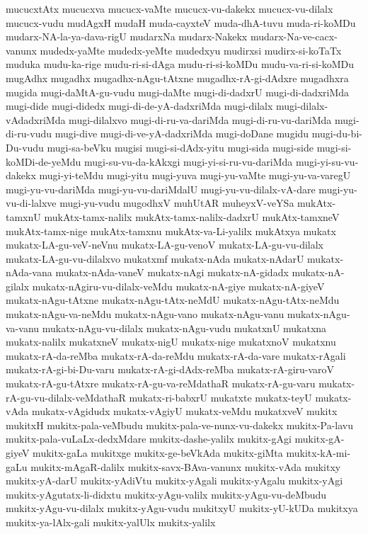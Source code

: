 {mucucxtAtx
mucucxva
mucucx-vaMte
mucucx-vu-dakekx
mucucx-vu-dilalx
mucucx-vudu
mudAgxH
mudaH
muda-cayxteV
muda-dhA-tuvu
muda-ri-koMDu
mudarx-NA-la-ya-dava-rigU
mudarxNa
mudarx-Nakekx
mudarx-Na-ve-cacx-vanunx
mudedx-yaMte
mudedx-yeMte
mudedxyu
mudirxsi
mudirx-si-koTaTx
muduka
mudu-ka-rige
mudu-ri-si-dAga
mudu-ri-si-koMDu
mudu-va-ri-si-koMDu
mugAdhx
mugadhx
mugadhx-nAgu-tAtxne
mugadhx-rA-gi-dAdxre
mugadhxra
mugida
mugi-daMtA-gu-vudu
mugi-daMte
mugi-di-dadxrU
mugi-di-dadxriMda
mugi-dide
mugi-didedx
mugi-di-de-yA-dadxriMda
mugi-dilalx
mugi-dilalx-vAdadxriMda
mugi-dilalxvo
mugi-di-ru-va-dariMda
mugi-di-ru-vu-dariMda
mugi-di-ru-vudu
mugi-dive
mugi-di-ve-yA-dadxriMda
mugi-doDane
mugidu
mugi-du-bi-Du-vudu
mugi-sa-beVku
mugisi
mugi-si-dAdx-yitu
mugi-sida
mugi-side
mugi-si-koMDi-de-yeMdu
mugi-su-vu-da-kAkxgi
mugi-yi-si-ru-vu-dariMda
mugi-yi-su-vu-dakekx
mugi-yi-teMdu
mugi-yitu
mugi-yuva
mugi-yu-vaMte
mugi-yu-va-varegU
mugi-yu-vu-dariMda
mugi-yu-vu-dariMdalU
mugi-yu-vu-dilalx-vA-dare
mugi-yu-vu-di-lalxve
mugi-yu-vudu
mugodhxV
muhUtAR
muheyxV-veYSa
mukAtx-tamxnU
mukAtx-tamx-nalilx
mukAtx-tamx-nalilx-dadxrU
mukAtx-tamxneV
mukAtx-tamx-nige
mukAtx-tamxnu
mukAtx-va-Li-yalilx
mukAtxya
mukatx
mukatx-LA-gu-veV-neVnu
mukatx-LA-gu-venoV
mukatx-LA-gu-vu-dilalx
mukatx-LA-gu-vu-dilalxvo
mukatxmf
mukatx-nAda
mukatx-nAdarU
mukatx-nAda-vana
mukatx-nAda-vaneV
mukatx-nAgi
mukatx-nA-gidadx
mukatx-nA-gilalx
mukatx-nAgiru-vu-dilalx-veMdu
mukatx-nA-giye
mukatx-nA-giyeV
mukatx-nAgu-tAtxne
mukatx-nAgu-tAtx-neMdU
mukatx-nAgu-tAtx-neMdu
mukatx-nAgu-va-neMdu
mukatx-nAgu-vano
mukatx-nAgu-vanu
mukatx-nAgu-va-vanu
mukatx-nAgu-vu-dilalx
mukatx-nAgu-vudu
mukatxnU
mukatxna
mukatx-nalilx
mukatxneV
mukatx-nigU
mukatx-nige
mukatxnoV
mukatxnu
mukatx-rA-da-reMba
mukatx-rA-da-reMdu
mukatx-rA-da-vare
mukatx-rAgali
mukatx-rA-gi-bi-Du-varu
mukatx-rA-gi-dAdx-reMba
mukatx-rA-giru-varoV
mukatx-rA-gu-tAtxre
mukatx-rA-gu-va-reMdathaR
mukatx-rA-gu-varu
mukatx-rA-gu-vu-dilalx-veMdathaR
mukatx-ri-babxrU
mukatxte
mukatx-teyU
mukatx-vAda
mukatx-vAgidudx
mukatx-vAgiyU
mukatx-veMdu
mukatxveV
mukitx
mukitxH
mukitx-pala-veMbudu
mukitx-pala-ve-nunx-vu-dakekx
mukitx-Pa-lavu
mukitx-pala-vuLaLx-dedxMdare
mukitx-dashe-yalilx
mukitx-gAgi
mukitx-gA-giyeV
mukitx-gaLa
mukitxge
mukitx-ge-beVkAda
mukitx-giMta
mukitx-kA-mi-gaLu
mukitx-mAgaR-dalilx
mukitx-savx-BAva-vanunx
mukitx-vAda
mukitxy
mukitx-yA-darU
mukitx-yAdiVtu
mukitx-yAgali
mukitx-yAgalu
mukitx-yAgi
mukitx-yAgutatx-li-didxtu
mukitx-yAgu-valilx
mukitx-yAgu-vu-deMbudu
mukitx-yAgu-vu-dilalx
mukitx-yAgu-vudu
mukitxyU
mukitx-yU-kUDa
mukitxya
mukitx-ya-lAlx-gali
mukitx-yalUlx
mukitx-yalilx
}
